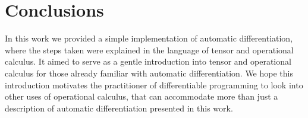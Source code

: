 \section{Conclusions}

In this work we provided a simple implementation of automatic differentiation, where the steps taken were explained in the language of tensor and operational calculus. It aimed to serve as a gentle introduction into tensor and operational calculus for those already familiar with automatic differentiation.
We hope this introduction motivates the practitioner of differentiable programming to look into other uses of operational calculus, that can accommodate more than just a description of automatic differentiation presented in this work.
